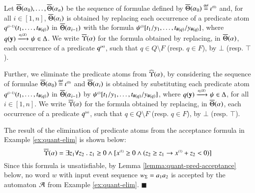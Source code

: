 \ifLongVersion
\begin{definition}\label{def:substform}
  Let $\overline{\Theta}({\alpha_0}), \ldots, \overline{\Theta}({\alpha_n})$ be the
  sequence of formulae defined by $\overline{\Theta}({\alpha_0}) \stackrel{\scriptscriptstyle{\mathsf{def}}}{=}
  {\iota}^{\scriptscriptstyle{({0})}}$ and, for all $i \in [1,n]$,
  $\overline{\Theta}({\alpha_i})$ is obtained by replacing each occurrence of
  a predicate atom ${q}^{\scriptscriptstyle{({i-1})}}(t_1,\ldots,t_{\#(q)})$ in
  $\overline{\Theta}({\alpha_{i-1}})$ with the formula
  ${\psi}^{\scriptscriptstyle{({i})}}[t_1/y_1,\ldots,t_{\#(q)}/y_{\#(q)}]$, where
  $q(\mathbf y) \xrightarrow{{\scriptscriptstyle a_{i}(X)}}_{{\scriptstyle }} \psi \in \Delta$. We write
  $\overline{\Upsilon}({\alpha})$ for the formula obtained by replacing, in
  $\overline{\Theta}({\alpha})$, each occurrence of a predicate
  ${q}^{\scriptscriptstyle{({n})}}$, such that $q \in Q \setminus F$ (resp. $q \in F$),
  by $\bot$ (resp. $\top$).
\end{definition}
\else
Further, we eliminate the predicate atoms from $\widehat{\Upsilon}({\alpha})$,
by considering the sequence of formulae $\overline{\Theta}({\alpha_0}) \stackrel{\scriptscriptstyle{\mathsf{def}}}{=}
{\iota}^{\scriptscriptstyle{({0})}}$ and $\overline{\Theta}({\alpha_i})$ is obtained by
substituting each predicate atom
${q}^{\scriptscriptstyle{({i-1})}}(t_1,\ldots,t_{\#(q)})$ in $\overline{\Theta}({\alpha_{i-1}})$
by ${\psi}^{\scriptscriptstyle{({i})}}[t_1/y_1,\ldots,t_{\#(q)}/y_{\#(q)}]$, where
$q(\mathbf y) \xrightarrow{{\scriptscriptstyle a_{i}(X)}}_{{\scriptstyle }} \psi \in \Delta$, for all $i \in
[1,n]$. We write $\overline{\Upsilon}({\alpha})$ for the formula obtained by
replacing, in $\overline{\Theta}({\alpha})$, each occurrence of a predicate
${q}^{\scriptscriptstyle{({n})}}$, such that $q \in Q \setminus F$ (resp. $q \in F$), by
$\bot$ (resp. $\top$).
\fi
\begin{example}\label{ex:pred-elim}
  The result of the elimination of predicate atoms from the acceptance
  formula in Example \ref{ex:quant-elim} is shown below:
  \[\overline{\Upsilon}({\alpha}) = 
  \exists z_1 \forall z_2 ~.~ z_1 \geq 0 \wedge 
          [{x}^{\scriptscriptstyle{({1})}} \geq 0 \wedge (z_2 \geq z_1 \rightarrow
            {x}^{\scriptscriptstyle{({1})}}+z_2 < 0)]\] Since this formula is
          unsatisfiable, by Lemma \ref{lemma:quant-pred-acceptance}
          below, no word $w$ with input event sequence ${w}_\Sigma =
          a_1a_2$ is accepted by the automaton $\mathcal{A}$ from Example
          \ref{ex:quant-elim}. \hfill$\blacksquare$
\end{example}

